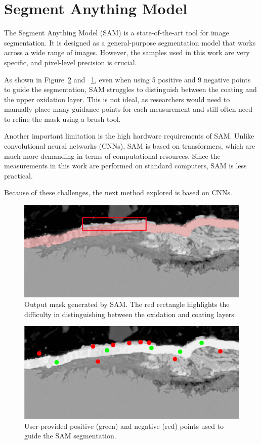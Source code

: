 \section{Segment Anything Model} \label{sec:sam}

The Segment Anything Model (SAM) \cite{kirillov2023segany} is a state-of-the-art tool for image segmentation. It is designed as a general-purpose segmentation model that works across a wide range of images. However, the samples used in this work are very specific, and pixel-level precision is crucial.

As shown in Figure~\ref{fig:enter-label} and ~\ref{fig:sam}, even when using 5 positive and 9 negative points to guide the segmentation, SAM struggles to distinguish between the coating and the upper oxidation layer. This is not ideal, as researchers would need to manually place many guidance points for each measurement and still often need to refine the mask using a brush tool.

Another important limitation is the high hardware requirements of SAM. Unlike convolutional neural networks (CNNs), SAM is based on transformers, which are much more demanding in terms of computational resources. Since the measurements in this work are performed on standard computers, SAM is less practical.

Because of these challenges, the next method explored is based on CNNs.

\begin{figure} [H]
    \centering 
    \includegraphics[width=0.7\linewidth]{PICTURES/SAM/rect.png} 
    \caption{Output mask generated by SAM. The red rectangle highlights the difficulty in distinguishing between the oxidation and coating layers.}

    \label{fig:sam} 
\end{figure}

\begin{figure} [H]
    \centering 
    \includegraphics[width=0.7\linewidth]{PICTURES/SAM/points_sam.png} 
    \caption{User-provided positive (green) and negative (red) points used to guide the SAM segmentation.} \label{fig:enter-label} 
\end{figure}